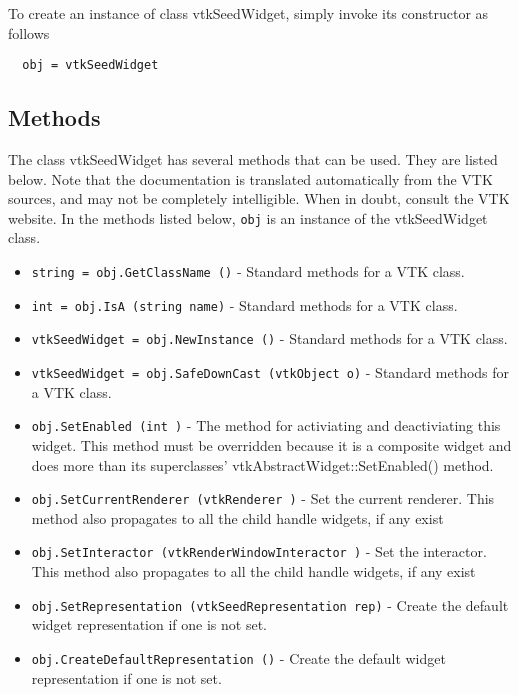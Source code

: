 To create an instance of class vtkSeedWidget, simply
invoke its constructor as follows
\begin{verbatim}
  obj = vtkSeedWidget
\end{verbatim}
\subsection{Methods}

The class vtkSeedWidget has several methods that can be used.
  They are listed below.
Note that the documentation is translated automatically from the VTK sources,
and may not be completely intelligible.  When in doubt, consult the VTK website.
In the methods listed below, \verb|obj| is an instance of the vtkSeedWidget class.
\begin{itemize}
\item  \verb|string = obj.GetClassName ()| -  Standard methods for a VTK class.

\item  \verb|int = obj.IsA (string name)| -  Standard methods for a VTK class.

\item  \verb|vtkSeedWidget = obj.NewInstance ()| -  Standard methods for a VTK class.

\item  \verb|vtkSeedWidget = obj.SafeDownCast (vtkObject o)| -  Standard methods for a VTK class.

\item  \verb|obj.SetEnabled (int )| -  The method for activiating and deactiviating this widget. This method
 must be overridden because it is a composite widget and does more than
 its superclasses' vtkAbstractWidget::SetEnabled() method.

\item  \verb|obj.SetCurrentRenderer (vtkRenderer )| -  Set the current renderer. This method also propagates to all the child
 handle widgets, if any exist

\item  \verb|obj.SetInteractor (vtkRenderWindowInteractor )| -  Set the interactor. This method also propagates to all the child
 handle widgets, if any exist

\item  \verb|obj.SetRepresentation (vtkSeedRepresentation rep)| -  Create the default widget representation if one is not set. 

\item  \verb|obj.CreateDefaultRepresentation ()| -  Create the default widget representation if one is not set. 


\end{itemize}
